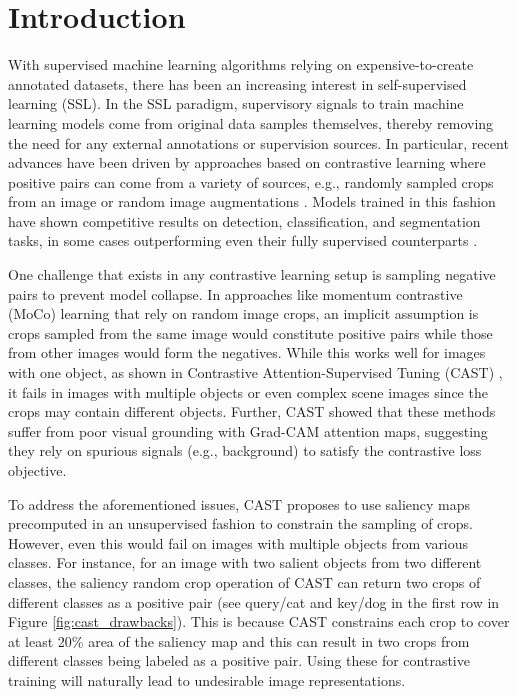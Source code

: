 \documentclass[10pt,twocolumn,letterpaper]{article}
\begin{document}

\section{Introduction}
\label{sec:intro}

With supervised machine learning algorithms relying on expensive-to-create annotated datasets, there has been an increasing interest in self-supervised learning (SSL). In the SSL paradigm, supervisory signals to train machine learning models come from original data samples themselves, thereby removing the need for any external annotations or supervision sources. In particular, recent advances have been driven by approaches based on contrastive learning where positive pairs can come from a variety of sources, e.g., randomly sampled crops from an image \cite{he2020momentum,selvaraju2021casting} or random image augmentations \cite{noroozi2016unsupervised,chen2020simple,chen2021exploring}. Models trained in this fashion have shown competitive results on detection, classification, and segmentation tasks, in some cases outperforming even their fully supervised counterparts \cite{he2022masked,wei2022masked}.

One challenge that exists in any contrastive learning setup is sampling negative pairs to prevent model collapse. In approaches like momentum contrastive (MoCo) learning \cite{he2020momentum} that rely on random image crops, an implicit assumption is crops sampled from the same image would constitute positive pairs while those from other images would form the negatives. While this works well for images with one object, as shown in Contrastive Attention-Supervised Tuning (CAST) \cite{selvaraju2021casting}, it fails in images with multiple objects or even complex scene images since the crops may contain different objects. Further, CAST showed that these methods suffer from poor visual grounding with Grad-CAM attention maps, suggesting they rely on spurious signals (e.g., background) to satisfy the contrastive loss objective. 


To address the aforementioned issues, CAST \cite{selvaraju2021casting} proposes to use saliency maps precomputed in an unsupervised fashion to constrain the sampling of crops. However, even this would fail on images with multiple objects from various classes. For instance, for an image with two salient objects from two different classes, the saliency random crop operation of CAST \cite{selvaraju2021casting} can return two crops of different classes as a positive pair (see query/cat and key/dog in the first row in Figure \ref{fig:cast_drawbacks}). This is because CAST constrains each crop to cover at least 20\% area of the saliency map and this can result in two crops from different classes being labeled as a positive pair. Using these for contrastive training will naturally lead to undesirable image representations.
\end{document}
